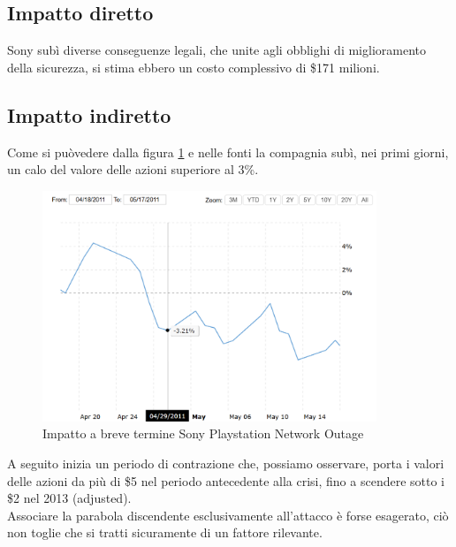 \documentclass[12pt,a4paper,openright,twoside]{report}
\begin{document}
\subsection{Impatto diretto}
Sony sub\`i diverse conseguenze legali, che unite agli obblighi di miglioramento della sicurezza, si stima ebbero un costo complessivo di \$171 milioni.\\
\subsection{Impatto indiretto}
Come si pu\`ovedere dalla figura \ref{fig:pnt1} e nelle fonti \cite{Sony_pnt} la compagnia sub\`i, nei primi giorni, un calo del valore delle azioni  superiore al 3\%.\\

\begin{figure}[H] 
\begin{center} 
\includegraphics[width=10cm]{figures/sony_2011_shortTerm.png} 
\caption[Grafico Sony PSN short]{Impatto a breve termine Sony Playstation Network Outage}\label{fig:pnt1}
\end{center}
\end{figure}

A seguito inizia un periodo di contrazione che, possiamo osservare, porta i valori delle azioni da pi\`u di \$5 nel periodo antecedente alla crisi, fino a scendere sotto i \$2 nel 2013 (adjusted). \\Associare la parabola discendente esclusivamente all'attacco \`e forse esagerato, ci\`o non toglie che si tratti sicuramente di un fattore rilevante.\\ 
\end{document}
